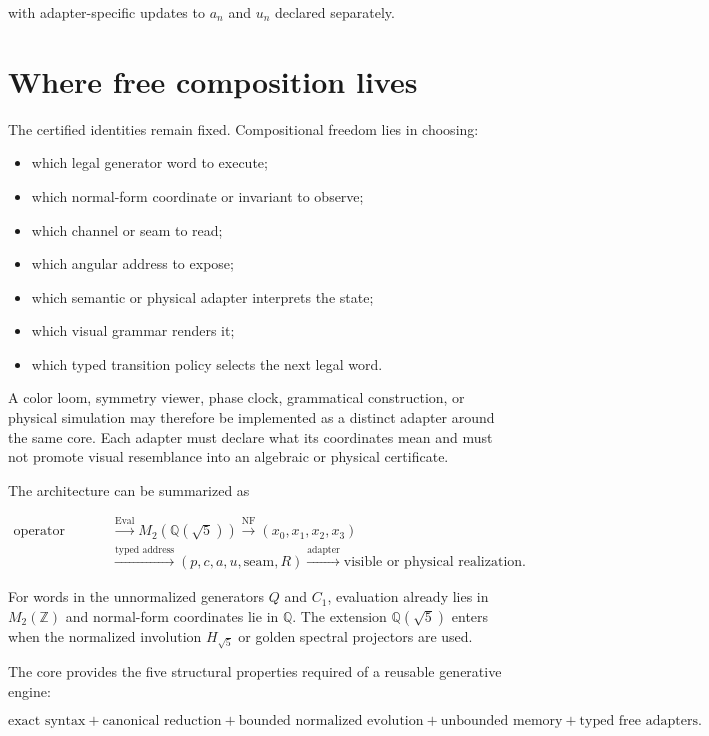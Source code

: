 \documentclass[11pt,letterpaper]{article}
\theoremstyle{clearonyx}
\newcommand{\Qfield}{\mathbb{Q}}
\newcommand{\Z}{\mathbb{Z}}
\newcommand{\NF}{\operatorname{NF}}
\newcommand{\Eval}{\operatorname{Eval}}
\begin{document}
with adapter-specific updates to $a_n$ and $u_n$ declared separately.

\section{Where free composition lives}

The certified identities remain fixed.  Compositional freedom lies in choosing:

\begin{itemize}
  \item which legal generator word to execute;
  \item which normal-form coordinate or invariant to observe;
  \item which channel or seam to read;
  \item which angular address to expose;
  \item which semantic or physical adapter interprets the state;
  \item which visual grammar renders it;
  \item which typed transition policy selects the next legal word.
\end{itemize}

A color loom, symmetry viewer, phase clock, grammatical construction, or physical simulation may therefore be implemented as a distinct adapter around the same core.  Each adapter must declare what its coordinates mean and must not promote visual resemblance into an algebraic or physical certificate.

The architecture can be summarized as

\begin{equation}
\boxed{
\begin{aligned}
\text{operator words}
&\xrightarrow{\Eval}
M_2\!\left(\Qfield(\sqrt5)\right)
\xrightarrow{\NF}
(x_0,x_1,x_2,x_3)\\
&\xrightarrow{\text{typed address}}
(p,c,a,u,\text{seam},R)
\xrightarrow{\text{adapter}}
\text{visible or physical realization}.
\end{aligned}}
\end{equation}

For words in the unnormalized generators $Q$ and $C_1$, evaluation already lies in $M_2(\Z)$ and normal-form coordinates lie in $\Qfield$.  The extension $\Qfield(\sqrt5)$ enters when the normalized involution $H_{\sqrt5}$ or golden spectral projectors are used.

\begin{resultbox}
The core provides the five structural properties required of a reusable generative engine:

\begin{equation*}
\boxed{
\text{exact syntax}
+\text{canonical reduction}
+\text{bounded normalized evolution}
+\text{unbounded memory}
+\text{typed free adapters}.
}
\end{equation*}
\end{resultbox}
\end{document}
